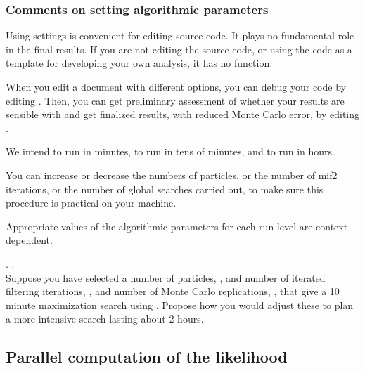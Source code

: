 \begin{frame}[fragile]

\frametitle{Comments on setting algorithmic parameters}

\bi

\item Using  settings is convenient for editing source code. It plays no fundamental role in the final results. If you are not editing the source code, or using the code as a template for developing your own analysis, it has no function.

\item When you edit a document with different  options, you can debug your code by editing . Then, you can get preliminary assessment of whether your results are sensible with  and get finalized results, with reduced Monte Carlo error, by editing .

\item We intend  to run in minutes,  to run in tens of minutes, and  to run in hours.

\item You can increase or decrease the numbers of particles, or the number of mif2 iterations, or the number of global searches carried out, to make sure this procedure is practical on your machine.
 
\item Appropriate values of the algorithmic parameters for each run-level are context dependent.

\ei

\end{frame}

\begin{frame}[fragile]

\myexercise. .\\
Suppose you have selected a number of particles, , and number of iterated filtering iterations, , and number of Monte Carlo replications, , that give a 10 minute maximization search using . Propose how you would adjust these to plan a more intensive search lasting about 2 hours.


\end{frame}

\subsection*{Parallel computation of the likelihood}

